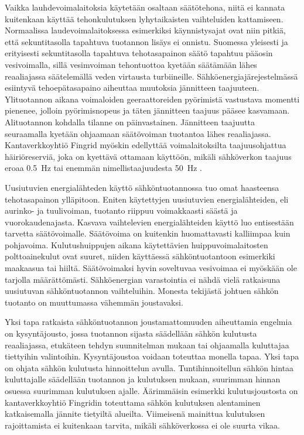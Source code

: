   Vaikka lauhdevoimalaitoksia käytetään osaltaan säätötehona, niitä ei kannata kuitenkaan käyttää tehonkulutuksen lyhytaikaisten vaihteluiden kattamiseen. Normaalissa laudevoimalaitoksessa esimerkiksi käynnistysajat ovat niin pitkiä, että sekuntitasolla tapahtuva tuotannon lisäys ei onnistu.\parencite{VJV2018} Suomessa yleisesti ja erityisesti sekuntitasolla tapahtuva tehotasapainon säätö tapahtuu pääosin vesivoimalla\parencite{energiateollisuus}, sillä vesimvoiman tehontuottoa kyetään säätämään lähes reaaliajassa säätelemällä veden virtausta turbiineille. Sähköenergiajärejestelmässä esiintyvä tehoepätasapaino aiheuttaa muutoksia jännitteen taajuuteen. Ylituotannon aikana voimaloiden geeraattoreiden pyörimistä vastustava momentti pienenee, jolloin pyörimisnopeus ja täten jännitteen taajuus pääsee kasvamaan. Alituotannon kohdalla tilanne on päinvastainen. Jännitteen taajuutta seuraamalla kyetään ohjaamaan säätövoiman tuotantoa lähes reaaliajassa. Kantaverkkoyhtiö Fingrid myöskin edellyttää voimalaitoksilta taajuusohjattua häiriöreserviä, joka on kyettävä ottamaan käyttöön, mikäli sähköverkon taajuus eroaa \SI{0.5}{\hertz} tai enemmän nimellistaajuudesta \SI{50}{\hertz} \parencite{VJV2018}.

  Uusiutuvien energialähteden käyttö sähköntuotannossa tuo omat haasteensa tehotasapainon ylläpitoon. Eniten käytettyjen uusiutuvien energialähteiden, eli aurinko- ja tuulivoiman, tuotanto riippuu voimakkaasti säästä ja vuorokaudenajasta. Kasvava vaihtelevien energialähteiden käyttö luo entisestään tarvetta säätövoimalle.\parencite{energiateollisuus} Säätövoima on kuitenkin huomattavasti kalliimpaa kuin pohjavoima. Kulutushuippujen aikana käytettävien huippuvoimalaitosten polttoainekulut ovat suuret, niiden käyttäessä sähköntuotantoon esimerkiki maakaasua tai hiiltä. Säätövoimaksi hyvin soveltuvaa vesivoimaa ei myöskään ole tarjolla määrättömästi. Sähköenergian varastointia ei nähdä vielä ratkaisuna uusiutuvan sähköntuotannon vaihteluihin. Monesta tekijästä johtuen sähkön tuotanto on muuttumassa vähemmän joustavaksi.

  Yksi tapa ratkaista sähköntuotannon joustamattomuuden aiheuttamia engelmia on kysyntäjousto, jossa tuotannon sijasta säädellään sähkön kulutusta reaaliajassa, etukäteen tehdyn suunnitelman mukaan tai ohjaamalla kuluttajaa tiettyihin valintoihin. Kysyntäjoustoa voidaan toteuttaa monella tapaa.\parencite{fingrid} Yksi tapa on ohjata sähkön kulutusta hinnoittelun avulla. Tuntihinnoitellun sähkön hintaa kuluttajalle säädellään tuotannon ja kulutuksen mukaan, suurimman hinnan osuessa suurimman kulutuksen ajalle. Äärimmäisin esimerkki kulutusjoustosta on kantaverkkoyhtiö Fingridin toteuttama sähkön kulutuksen alentaminen katkaisemalla jännite tietyiltä alueilta. Viimeisenä mainittua kulutuksen rajoittamista ei kuitenkaan tarvita, mikäli sähköverkossa ei ole suurta vikaa.

